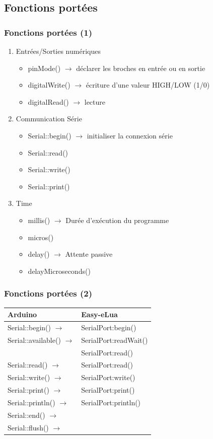 \documentclass{beamer}
\begin{document}
\subsection{Fonctions portées}
\begin{frame}
\frametitle{Fonctions portées (1)}
\begin{enumerate}
 \item Entrées/Sorties numériques
\begin{itemize}
\item pinMode() $\to$ déclarer les broches en entrée ou en sortie
\item digitalWrite() $\to$ écriture d'une valeur HIGH/LOW (1/0)
\item digitalRead() $\to$ lecture
\end{itemize}
\item Communication Série
\begin{itemize}
\item Serial::begin() $\to$ initialiser la connexion série
\item Serial::read()
\item Serial::write()
\item Serial::print()
\end{itemize}
\item Time
\begin{itemize}
\item millis()  $\to$ Durée d'exécution du programme
\item micros()
\item delay()  $\to$ Attente passive
\item delayMicroseconds()
\end{itemize}
\end{enumerate}
\end{frame}

\begin{frame}
\frametitle{Fonctions portées (2)}
\begin{table}[h]
 \begin{tabular}{|l|l|} \hline
\textbf{Arduino} & \textbf{Easy-eLua} \\ \hline
Serial::begin() $\to$ & SerialPort:begin() \\ \hline
Serial::available() $\to$ & SerialPort:readWait() \\
                          & SerialPort:read() \\ \hline
Serial::read() $\to$ & SerialPort:read() \\ \hline
Serial::write() $\to$ & SerialPort:write() \\ \hline
Serial::print() $\to$ & SerialPort:print() \\ \hline
Serial::println() $\to$ & SerialPort:println() \\ \hline
Serial::end() $\to$ & \\ \hline
Serial::flush() $\to$ & \\ \hline
 \end{tabular}
\end{table}
\end{frame}
\end{document}
